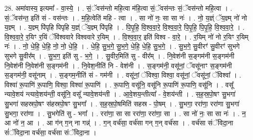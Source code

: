 \documentclass[17pt]{extarticle}
\begin{document}
28. अमा॑वास्य॒ इत्यमा᳚ - वा॒स्ये॒ । . सं॒ॅवस॑न्तो महि॒त्वा म॑हि॒त्वा सं॒ॅवस॑न्तः सं॒ॅवस॑न्तो महि॒त्वा । . सं॒ॅवस॑न्त॒ इति॑ सं - वस॑न्तः । . म॒हि॒त्वेति॑ महि - त्वा । . सा नो॑ नः॒ सा सा नः॑ । . नो॒ य॒ज्ञ्ं ॅय॒ज्ञ्म् नो॑ नो य॒ज्ञ्म् । . य॒ज्ञ्म् पि॑पृहि पिपृहि य॒ज्ञ्ं ॅय॒ज्ञ्म् पि॑पृहि । . पि॒पृ॒हि॒ वि॒श्व॒वा॒रे॒ वि॒श्व॒वा॒रे॒ पि॒पृ॒हि॒ पि॒पृ॒हि॒ वि॒श्व॒वा॒रे॒ । . वि॒श्व॒वा॒रे॒ र॒यिꣳ र॒यिं ॅवि॑श्ववारे विश्ववारे र॒यिम् । . वि॒श्व॒वा॒र॒ इति॑ विश्व - वा॒रे॒ । . र॒यिम् नो॑ नो र॒यिꣳ र॒यिम् नः॑ । . नो॒ धे॒हि॒ धे॒हि॒ नो॒ नो॒ धे॒हि॒ । . धे॒हि॒ सु॒भ॒गे॒ सु॒भ॒गे॒ धे॒हि॒ धे॒हि॒ सु॒भ॒गे॒ । . सु॒भ॒गे॒ सु॒वीरꣳ॑ सु॒वीरꣳ॑ सुभगे सुभगे सु॒वीर᳚म् । . सु॒भ॒ग॒ इति॑ सु - भ॒गे॒ । . सु॒वीर॒मिति॑ सु - वीर᳚म् । . नि॒वेश॑नी स॒ङ्गम॑नी स॒ङ्गम॑नी नि॒वेश॑नी नि॒वेश॑नी स॒ङ्गम॑नी । . नि॒वेश॒नीति॑ नि - वेश॑नी । . स॒ङ्गम॑नी॒ वसू॑नां॒ ॅवसू॑नाꣳ स॒ङ्गम॑नी स॒ङ्गम॑नी॒ वसू॑नाम् । . स॒ङ्गम॒नीति॑ सं - गम॑नी । . वसू॑नां॒ ॅविश्वा॒ विश्वा॒ वसू॑नां॒ ॅवसू॑नां॒ ॅविश्वा᳚ । . विश्वा॑ रू॒पाणि॑ रू॒पाणि॒ विश्वा॒ विश्वा॑ रू॒पाणि॑ । . रू॒पाणि॒ वसू॑नि॒ वसू॑नि रू॒पाणि॑ रू॒पाणि॒ वसू॑नि । . वसू᳚ न्यावे॒शय॑ न्त्यावे॒शय॑न्ती॒ वसू॑नि॒ वसू᳚ न्यावे॒शय॑न्ती । . आ॒वे॒शय॒न्तीत्या᳚ - वे॒शय॑न्ती । . स॒ह॒स्र॒पो॒षꣳ सु॒भगा॑ सु॒भगा॑ सहस्रपो॒षꣳ स॑हस्रपो॒षꣳ सु॒भगा᳚ । . स॒ह॒स्र॒पो॒षमिति॑ सहस्र - पो॒षम् । . सु॒भगा॒ ररा॑णा॒ ररा॑णा सु॒भगा॑ सु॒भगा॒ ररा॑णा । . सु॒भगेति॑ सु - भगा᳚ । . ररा॑णा॒ सा सा ररा॑णा॒ ररा॑णा॒ सा । . सा नो॑ नः॒ सा सा नः॑ । . न॒ आ नो॑ न॒ आ । . आ ग॑न् ग॒न् ना गन्न्॑ । . ग॒न् वर्च॑सा॒ वर्च॑सा गन् ग॒न् वर्च॑सा । . वर्च॑सा संॅविदा॒ना सं॑ॅविदा॒ना वर्च॑सा॒ वर्च॑सा संॅविदा॒ना । \newline
\end{document}
